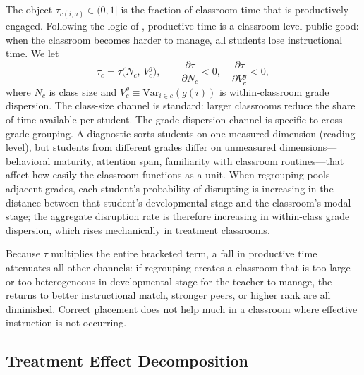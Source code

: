 \documentclass[11pt]{article}
\begin{document}
The object $\tau_{c(i,a)} \in (0, 1]$ is the fraction of classroom time that is productively engaged. Following the logic of \citet{Lazear2001}, productive time is a classroom-level public good: when the classroom becomes harder to manage, all students lose instructional time. We let
\begin{equation}
\label{eq:tau}
\tau_c = \tau\!\big(N_c,\, V^g_c\big), \qquad \frac{\partial\tau}{\partial N_c} < 0, \quad \frac{\partial\tau}{\partial V^g_c} < 0,
\end{equation}
where $N_c$ is class size and $V^g_c \equiv \text{Var}_{i \in c}(g(i))$ is within-classroom grade dispersion. The class-size channel is standard: larger classrooms reduce the share of time available per student. The grade-dispersion channel is specific to cross-grade grouping. A diagnostic sorts students on one measured dimension (reading level), but students from different grades differ on unmeasured dimensions---behavioral maturity, attention span, familiarity with classroom routines---that affect how easily the classroom functions as a unit. When regrouping pools adjacent grades, each student's probability of disrupting is increasing in the distance between that student's developmental stage and the classroom's modal stage; the aggregate disruption rate is therefore increasing in within-class grade dispersion, which rises mechanically in treatment classrooms.

Because $\tau$ multiplies the entire bracketed term, a fall in productive time attenuates all other channels: if regrouping creates a classroom that is too large or too heterogeneous in developmental stage for the teacher to manage, the returns to better instructional match, stronger peers, or higher rank are all diminished. Correct placement does not help much in a classroom where effective instruction is not occurring.

\subsection{Treatment Effect Decomposition}
\end{document}
